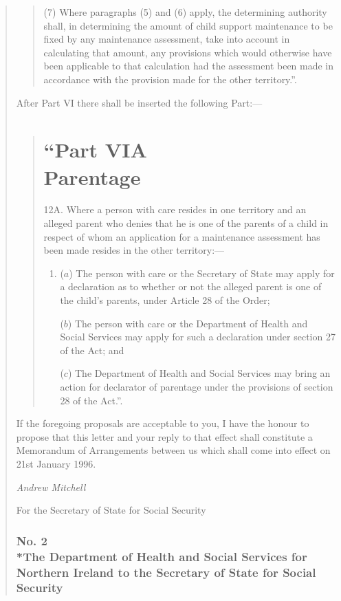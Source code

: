 \documentclass[12pt,a4paper]{article}
\begin{document}
\begin{quotation}
\begin{quotation}
(7) Where paragraphs (5) and (6) apply, the determining authority shall, in determining the amount of child support maintenance to be fixed by any maintenance assessment, take into account in calculating that amount, any provisions which would otherwise have been applicable to that calculation had the assessment been made in accordance with the provision made for the other territory.”.
\end{quotation}

  After Part VI there shall be inserted the following Part:—
\begin{quotation}
 \part*{“Part VIA\\Parentage}

12A.  Where a person with care resides in one territory and an alleged parent who denies that he is one of the parents of a child in respect of whom an application for a maintenance assessment has been made resides in the other territory:—
\begin{enumerate}\item[]
($a$) The person with care or the Secretary of State may apply for a declaration as to whether or not the alleged parent is one of the child’s parents, under Article 28 of the Order;

($b$) The person with care or the Department of Health and Social Services may apply for such a declaration under section 27 of the Act; and

($c$) The Department of Health and Social Services may bring an action for declarator of parentage under the provisions of section 28 of the Act.”.
\end{enumerate}
\end{quotation}

  If the foregoing proposals are acceptable to you, I have the honour to propose that this letter and your reply to that effect shall constitute a Memorandum of Arrangements between us which shall come into effect on 21st January 1996.

  \emph{Andrew Mitchell}

  For the Secretary of State for Social Security

\section*{\sloppy No. 2\\*The Department of Health and Social Services for Northern Ireland to the Secretary of State for Social Security}


\end{quotation}
\end{document}
